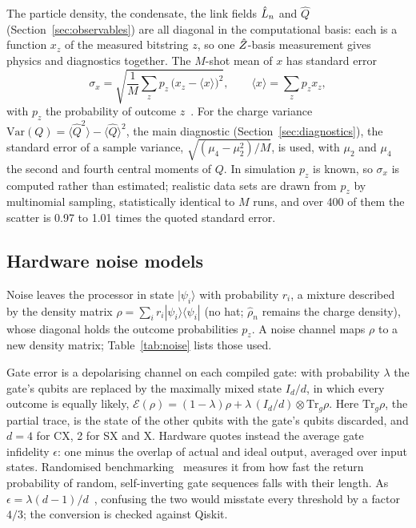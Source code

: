 The particle density, the condensate, the link fields $\hat{L}_{n}$ and $\hat Q$
(Section~\ref{sec:observables}) are all diagonal in the computational basis:
each is a function $x_z$ of the measured bitstring $z$, so one $\hat{Z}_{}$-basis
measurement gives physics and diagnostics together. The $M$-shot mean
of $x$ has standard error
\begin{equation}
  \label{eq:sigma}
  \sigma_x = \sqrt{\frac{1}{M}\sum_z p_z\,\bigl(x_z - \langle x\rangle\bigr)^2},
  \qquad \langle x\rangle = \sum_z p_z x_z ,
\end{equation}
with $p_z$ the probability of outcome $z$~\cite{taylor1997}. For the charge
variance $\mathrm{Var}(Q) = \langle\hat Q^2\rangle - \langle\hat Q\rangle^2$, the
main diagnostic (Section~\ref{sec:diagnostics}), the standard error of a sample
variance, $\sqrt{(\mu_4 - \mu_2^2)/M}$, is used, with $\mu_2$ and $\mu_4$ the
second and fourth central moments of $Q$. In simulation $p_z$ is known, so
$\sigma_x$ is computed rather than estimated; realistic data sets are drawn from
$p_z$ by
multinomial sampling, statistically identical to $M$ runs, and over 400 of them
the scatter is 0.97 to 1.01 times the quoted standard error.

\subsection{Hardware noise models}
\label{sec:noise}

Noise leaves the processor in state $|\psi_i\rangle$ with probability $r_i$, a
mixture described by the density matrix
$\rho = \sum_i r_i|\psi_i\rangle\langle\psi_i|$ (no hat; $\hat\rho_n$ remains
the charge density), whose diagonal holds the outcome probabilities $p_z$. A noise channel maps $\rho$ to a new density
matrix; Table~\ref{tab:noise} lists those used.

Gate error is a depolarising channel on each compiled gate: with probability
$\lambda$ the gate's qubits are replaced by the maximally mixed state $I_d/d$,
in which every outcome is equally likely,
$\mathcal{E}(\rho) = (1-\lambda)\rho + \lambda\,(I_d/d)\otimes\mathrm{Tr}_g\rho$.
Here $\mathrm{Tr}_g\rho$, the partial trace, is the state of the other qubits
with the gate's qubits discarded, and $d = 4$ for CX, 2 for SX and X. Hardware
quotes instead the average gate infidelity $\epsilon$: one minus the overlap of
actual and ideal output, averaged over input states. Randomised
benchmarking~\cite{magesan2011} measures it from how fast the return
probability of random, self-inverting gate sequences falls with their length.
As
$\epsilon = \lambda(d-1)/d$~\cite{nielsen2010,magesan2011}, confusing the two
would misstate every threshold by a factor $4/3$; the conversion is checked against
Qiskit.

